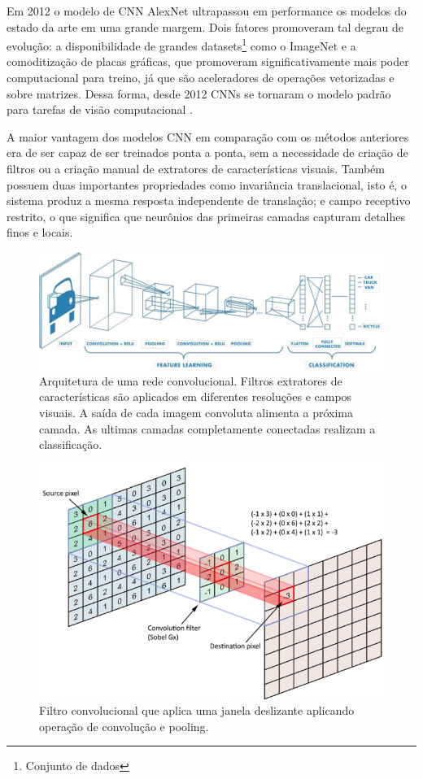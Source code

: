 Em 2012 o modelo de CNN AlexNet ultrapassou em performance os modelos do estado da arte em uma grande margem. Dois fatores promoveram tal degrau de evolução: a disponibilidade de grandes datasets\footnote{Conjunto de dados} como o ImageNet e a comoditização de placas gráficas, que promoveram significativamente mais poder computacional para treino, já que são aceleradores de operações vetorizadas e sobre matrizes. Dessa forma, desde 2012 CNNs se tornaram o modelo padrão para tarefas de visão computacional \cite{alom2018history}.

A maior vantagem dos modelos CNN em comparação com os métodos anteriores era de ser capaz de ser treinados ponta a ponta, sem a necessidade de criação de filtros ou a criação manual de extratores de características visuais. Também possuem duas importantes propriedades como invariância translacional, isto é, o sistema produz a mesma resposta independente de translação; e campo receptivo restrito, o que significa que neurônios das primeiras camadas capturam detalhes finos e locais.
\begin{figure}[!ht]
    \centering
    \includegraphics[width=0.95\columnwidth]{
        Imagens/CNN_mathworks.jpg
    }
    \caption{Arquitetura de uma rede convolucional. Filtros extratores de características são aplicados em diferentes resoluções e campos visuais. A saída de cada imagem convoluta alimenta a próxima camada. As ultimas camadas completamente conectadas realizam a classificação.}
    \label{fig:cnn}
\end{figure}

\begin{figure}[!ht]
    \centering
    \includegraphics[width=0.6\columnwidth]{
        Imagens/operacao_conv.png
    }
    \caption{
 Filtro convolucional que aplica uma janela deslizante aplicando operação de convolução e pooling.  
    }
    \label{fig:conv}
\end{figure}






